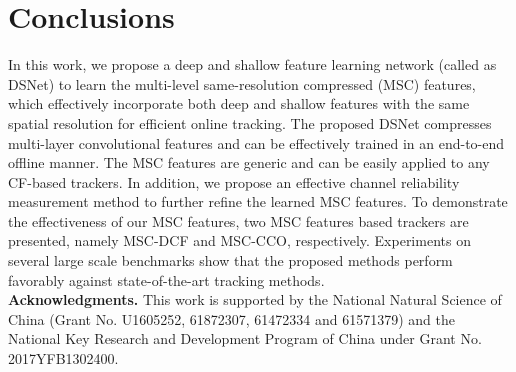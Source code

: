 \documentclass[runningheads]{llncs}
\begin{document}
\section{Conclusions}
In this work, we propose a deep and shallow feature learning network (called as DSNet) to learn the multi-level same-resolution compressed (MSC) features, which effectively incorporate both deep and shallow features with the same spatial resolution for efficient online tracking. The proposed DSNet compresses multi-layer convolutional features and can be effectively trained in an end-to-end offline manner. The MSC features are generic and can be easily applied to any CF-based trackers. In addition, we propose an effective channel reliability measurement method to further refine the learned MSC features. To demonstrate the effectiveness of our MSC features, two MSC features based trackers are presented, namely MSC-DCF and MSC-CCO, respectively. Experiments on several large scale benchmarks show that the proposed methods perform favorably against state-of-the-art tracking methods.
\\

\noindent \textbf{Acknowledgments.} This work is supported by the National Natural Science of China (Grant No. U1605252, 61872307, 61472334 and 61571379) and the National Key Research and Development Program of China under Grant No. 2017YFB1302400.













\end{document}

